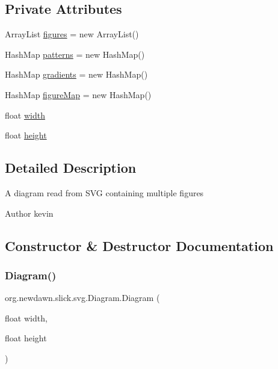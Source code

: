 \subsection*{Private Attributes}
\begin{DoxyCompactItemize}
\item 
Array\+List \mbox{\hyperlink{classorg_1_1newdawn_1_1slick_1_1svg_1_1_diagram_aaddbe68bc0b0c847583aa35d530aba2f}{figures}} = new Array\+List()
\item 
Hash\+Map \mbox{\hyperlink{classorg_1_1newdawn_1_1slick_1_1svg_1_1_diagram_ae97126aa813213972c4c755710ab13e6}{patterns}} = new Hash\+Map()
\item 
Hash\+Map \mbox{\hyperlink{classorg_1_1newdawn_1_1slick_1_1svg_1_1_diagram_acdc6103a0bc213559f53001de2c06548}{gradients}} = new Hash\+Map()
\item 
Hash\+Map \mbox{\hyperlink{classorg_1_1newdawn_1_1slick_1_1svg_1_1_diagram_a71c079c584be2e55632123b9b2d939ad}{figure\+Map}} = new Hash\+Map()
\item 
float \mbox{\hyperlink{classorg_1_1newdawn_1_1slick_1_1svg_1_1_diagram_aa2e5e9291614fb66fef4f8d0672a9da6}{width}}
\item 
float \mbox{\hyperlink{classorg_1_1newdawn_1_1slick_1_1svg_1_1_diagram_a5b6d7878e986b788521bb72fb0168518}{height}}
\end{DoxyCompactItemize}


\subsection{Detailed Description}
A diagram read from S\+VG containing multiple figures

\begin{DoxyAuthor}{Author}
kevin 
\end{DoxyAuthor}


\subsection{Constructor \& Destructor Documentation}
\mbox{\label{classorg_1_1newdawn_1_1slick_1_1svg_1_1_diagram_a195b124503d16a62bdb6a36dfb8effee}} 
\subsubsection{\texorpdfstring{Diagram()}{Diagram()}}
{\footnotesize\ttfamily org.\+newdawn.\+slick.\+svg.\+Diagram.\+Diagram (\begin{DoxyParamCaption}\item[{float}]{width,  }\item[{float}]{height }\end{DoxyParamCaption})\hspace{0.3cm}{\ttfamily [inline]}}

